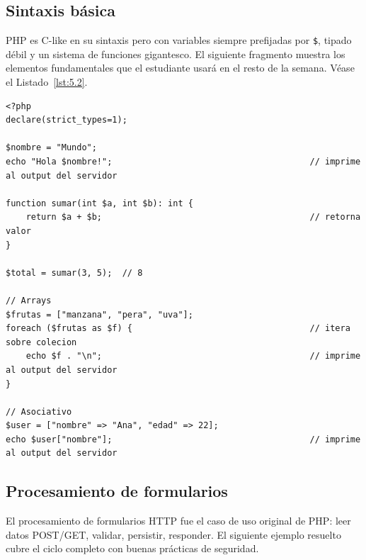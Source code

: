 \documentclass[11pt,a4paper,openany]{book}
\begin{document}
\subsection{Sintaxis básica}

PHP es C-like en su sintaxis pero con variables siempre
prefijadas por \texttt{\$}, tipado débil y un sistema de funciones
gigantesco. El siguiente fragmento muestra los elementos
fundamentales que el estudiante usará en el resto de la semana. V\'ease el Listado~\ref{lst:5.2}.


\begin{lstlisting}[style=php,numbers=none,caption={Ejemplo de PHP},label=lst:5.2]
<?php
declare(strict_types=1);

$nombre = "Mundo";
echo "Hola $nombre!";                                       // imprime al output del servidor

function sumar(int $a, int $b): int {
    return $a + $b;                                         // retorna valor
}

$total = sumar(3, 5);  // 8

// Arrays
$frutas = ["manzana", "pera", "uva"];
foreach ($frutas as $f) {                                   // itera sobre colecion
    echo $f . "\n";                                         // imprime al output del servidor
}

// Asociativo
$user = ["nombre" => "Ana", "edad" => 22];
echo $user["nombre"];                                       // imprime al output del servidor
\end{lstlisting}

\subsection{Procesamiento de formularios}

El procesamiento de formularios HTTP fue el caso de uso
original de PHP: leer datos POST/GET, validar, persistir, responder.
El siguiente ejemplo resuelto cubre el ciclo completo con buenas
prácticas de seguridad.
\end{document}
